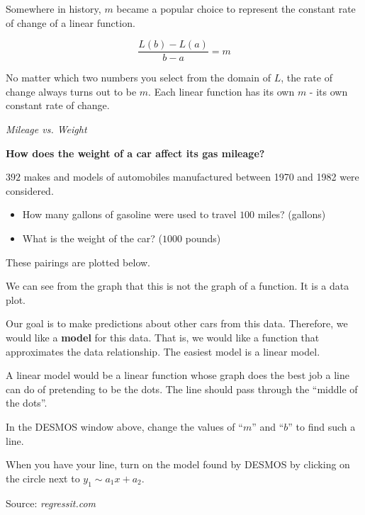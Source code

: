 \documentclass{ximera}
\begin{document}
Somewhere in history, $m$ became a popular choice to represent the constant rate of change of a linear function.



\[
\frac{L(b) - L(a)}{b - a} = m
\]





No matter which two numbers you select from the domain of $L$, the rate of change always turns out to be $m$.  Each linear function has its own $m$ - its own constant rate of change.






\begin{model} \textit{Mileage vs. Weight}

\textbf{How does the weight of a car affect its gas mileage?} 



$392$ makes and models of automobiles manufactured between 1970 and 1982 were considered.  

\begin{itemize}
\item How many gallons of gasoline were used to travel $100$ miles?   (gallons)
\item What is the weight of the car?    ($1000$ pounds)
\end{itemize}


These pairings are plotted below.




\begin{center}
\end{center}


We can see from the graph that this is not the graph of a function.  It is a data plot.


Our goal is to make predictions about other cars from this data.  Therefore, we would like a \textbf{\textcolor{purple!85!blue}{model}} for this data.  That is, we would like a function that approximates the data relationship.  The easiest model is a linear model.


A linear model would be a linear function whose graph does the best job a line can do of pretending to be the dots.  The line should pass through the ``middle of the dots''.

In the DESMOS window above, change the values of ``$m$'' and ``$b$'' to find such a line. 

When you have your line, turn on the model found by DESMOS by clicking on the circle next to $y_1 \sim a_1 x + a_2$.


Source:   \textit{regressit.com}
\end{model}
\end{document}
